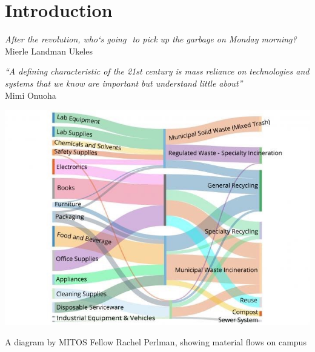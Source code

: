 \documentclass[nofonts,nols,justified,nobib]{tufte-book}
\begin{document}
\tableofcontents


\newpage
\setcounter{page}{1}
\renewcommand{\thepage}{\arabic{page}}

\chapter*{Introduction}

\begin{flushright}
\begin{flushright}
\emph{After the revolution, who`s going  to pick up the garbage on Monday morning?} \cite{ukeles_manifesto_1969}\\
Mierle Landman Ukeles
\end{flushright}
\end{flushright}


\begin{flushright}
\emph{``A defining characteristic of the 21st century is mass reliance on technologies and systems that we know are important but understand little about''} \cite{onuoha_i_2016}\\
Mimi Onuoha
\end{flushright}

\begin{marginfigure}
\includegraphics[width=\textwidth]{img/2/perlman-material.jpg}
\caption{A diagram by MITOS Fellow Rachel Perlman, showing material flows on campus}
\end{marginfigure}
\end{document}
